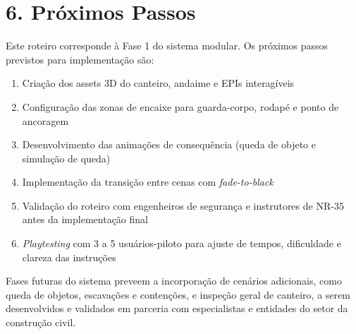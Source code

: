 \section*{6. Próximos Passos}

Este roteiro corresponde à Fase 1 do sistema modular. Os próximos passos previstos para implementação são:

\begin{enumerate}
    \item Criação dos assets 3D do canteiro, andaime e EPIs interagíveis
    \item Configuração das zonas de encaixe para guarda-corpo, rodapé e ponto de ancoragem
    \item Desenvolvimento das animações de consequência (queda de objeto e simulação de queda)
    \item Implementação da transição entre cenas com \textit{fade-to-black}
    \item Validação do roteiro com engenheiros de segurança e instrutores de NR-35 antes da implementação final
    \item \textit{Playtesting} com 3 a 5 usuários-piloto para ajuste de tempos, dificuldade e clareza das instruções
\end{enumerate}

Fases futuras do sistema preveem a incorporação de cenários adicionais, como queda de objetos, escavações e contenções, e inspeção geral de canteiro, a serem desenvolvidos e validados em parceria com especialistas e entidades do setor da construção civil.
